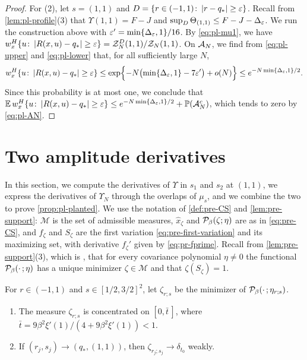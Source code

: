\begin{proof}
For (2), let $s=(1,1)$ and $D=\{r\in(-1,1)\colon\left|r-q_*\right|\ge\varepsilon\}$. Recall from \cref{lem:pl-profile}(3) that $\Upsilon(1,1)=F-J$ and $\sup_D\Theta_{(1,1)}\le F-J-\Delta_\varepsilon$. We run the construction above with $\varepsilon'=\min\{\Delta_\varepsilon,1\}/16$. By \eqref{eq:pl-mu1}, we have $w_x^H\{u\colon\left|R(x,u)-q_*\right|\ge\varepsilon\}=\mathcal Z_N^D(1,1)/\mathcal Z_N(1,1)$. On $\mathcal A_N$, we find from \eqref{eq:pl-upper} and \eqref{eq:pl-lower} that, for all sufficiently large $N$,
\[
w_x^H\{u\colon\left|R(x,u)-q_*\right|\ge\varepsilon\}\le\exp\Bigl\{-N\bigl(\min\{\Delta_\varepsilon,1\}-7\varepsilon'\bigr)+o(N)\Bigr\}\le e^{-N\min\{\Delta_\varepsilon,1\}/2}.
\]
Since this probability is at most one, we conclude that $\mathbb E\,w_x^H\{u\colon\left|R(x,u)-q_*\right|\ge\varepsilon\}\le e^{-N\min\{\Delta_\varepsilon,1\}/2}+\mathbb P(\mathcal A_N^c)$, which tends to zero by \eqref{eq:pl-AN}.
\end{proof}


\section{Two amplitude derivatives}\label{sec:pl-derivatives}

In this section, we compute the derivatives of $\Upsilon$ in $s_1$ and $s_2$ at $(1,1)$, we express the derivatives of $\Upsilon_N$ through the overlaps of $\mu_s$, and we combine the two to prove \cref{prop:pl-planted}. We use the notation of \cref{def:pre-CS} and \cref{lem:pre-support}: $\mathscr M$ is the set of admissible measures, $\hat x_\zeta$ and $\mathcal P_\beta(\zeta;\eta)$ are as in \eqref{eq:pre-CS}, and $f_\zeta$ and $S_\zeta$ are the first variation \eqref{eq:pre-first-variation} and its maximizing set, with derivative $f_\zeta'$ given by \eqref{eq:pr-fprime}. Recall from \cref{lem:pre-support}(3), which is \cite[Lemma~1.2]{HuangSellke2024}, that for every covariance polynomial $\eta\ne0$ the functional $\mathcal P_\beta(\cdot\,;\eta)$ has a unique minimizer $\zeta\in\mathscr M$ and that $\zeta(S_\zeta)=1$.

\begin{lemma}[Minimizers]\label{lem:pl-minimizers}
For $r\in(-1,1)$ and $s\in[1/2,3/2]^2$, let $\zeta_{r;s}$ be the minimizer of $\mathcal P_\beta(\cdot\,;\eta_{r;s})$.
\begin{enumerate}
\item The measure $\zeta_{r;s}$ is concentrated on $[0,\bar t\,]$, where $\bar t=9\beta^2\xi'(1)/(4+9\beta^2\xi'(1))<1$.
\item If $(r_j,s_j)\to(q_*,(1,1))$, then $\zeta_{r_j;s_j}\to\delta_{t_0}$ weakly.
\end{enumerate}
\end{lemma}

